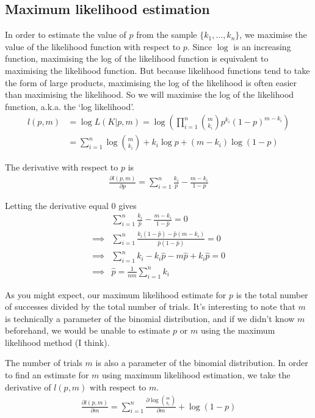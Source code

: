 \documentclass[a4paper,12pt]{article}
\theoremstyle{definition}
\newcommand{\pdiff}[2]{\frac{\partial #1}{\partial #2}} %
\begin{document}
\subsection{Maximum likelihood estimation}
In order to estimate the value of $p$ from the sample $\lbrace k_1, \dots , k_n \rbrace$, we maximise the value of the likelihood function with respect to $p$. Since $\log$ is an increasing function, maximising the log of the likelihood function is equivalent to maximising the likelihood function. But because likelihood functions tend to take the form of large products, maximising the log of the likelihood is often easier than maximising the likelihood. So we will maximise the log of the likelihood function, a.k.a. the `log likelihood'.
\begin{align}
  l(p, m)  &= \log L(K|p, m) = \log \left( \prod_{i=1}^n \binom{m}{k_i} p^{k_i}(1-p)^{m-k_i} \right) \\
        &= \sum_{i=1}^n \log \binom{m}{k_i} +  k_i \log p + (m - k_i) \log (1-p) 
\end{align}

The derivative with respect to $p$ is
\begin{align}
  \pdiff{l(p, m)}{p} = \sum_{i=1}^n \frac{k_i}{p} - \frac{m - k_i}{1-p}
\end{align}

Letting the derivative equal $0$ gives
\begin{align}
  & \sum_{i=1}^n \frac{k_i}{\hat{p}} - \frac{m - k_i}{1-\hat{p}} = 0 \\
  \implies & \sum_{i=1}^n \frac{k_i (1-\hat{p}) - \hat{p}(m - k_i)}{\hat{p}(1-\hat{p})} = 0 \\
  \implies & \sum_{i=1}^n k_i - k_i \hat{p} - m \hat{p} + k_i \hat{p} = 0 \\
  \implies & \hat{p} = \frac{1}{nm} \sum_{i=1}^n k_i
\end{align}

As you might expect, our maximum likelihood estimate for $p$ is the total number of successes divided by the total number of trials. It's interesting to note that $m$ is technically a parameter of the binomial distribution, and if we didn't know $m$ beforehand, we would be unable to estimate $p$ or $m$ using the maximum likelihood method (I think).

The number of trials $m$ is also a parameter of the binomial distribution. In order to find an estimate for $m$ using maximum likelihood estimation, we take the derivative of $l(p, m)$ with respect to $m$.
\begin{align}
  \pdiff{l(p, m)}{m} = \sum_{i=1}^n \pdiff{\log{\binom{m}{k_i}}}{m} + \log(1-p)
\end{align}
\end{document}
